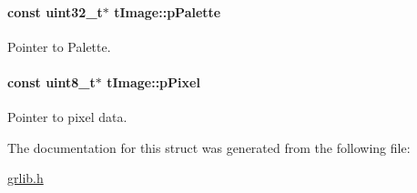 \paragraph[{p\+Palette}]{\setlength{\rightskip}{0pt plus 5cm}const uint32\+\_\+t$\ast$ t\+Image\+::p\+Palette}\label{structt_image_a931e08ce83a6fdeb70e841048bd6c2fc}


Pointer to Palette. 

\paragraph[{p\+Pixel}]{\setlength{\rightskip}{0pt plus 5cm}const uint8\+\_\+t$\ast$ t\+Image\+::p\+Pixel}\label{structt_image_a0bccc8fd4af99087b851cc3aa74e8307}


Pointer to pixel data. 



The documentation for this struct was generated from the following file\+:\begin{DoxyCompactItemize}
\item 
\hyperlink{grlib_8h}{grlib.\+h}\end{DoxyCompactItemize}

